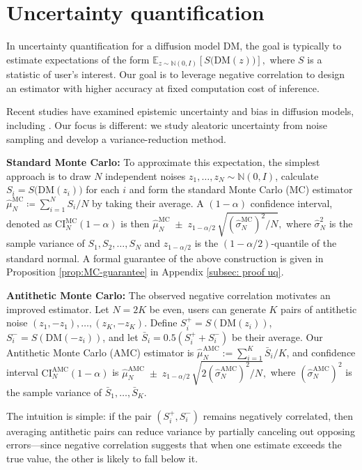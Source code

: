 \documentclass[12pt]{article}
\newcommand{\0}{\mathbf{0}}
\newcommand{\bE}{\mathbb{E}}
\newcommand{\bN}{\mathbb{N}}
\newcommand{\DM}{\text{DM}}
\newcommand{\MC}{\text{MC}}
\newcommand{\CI}{\text{CI}}
\newcommand{\AMC}{\text{AMC}}
\begin{document}
\section{Uncertainty quantification}\label{sec:uncertainty quantification}

In uncertainty quantification for a diffusion model $\DM$, the goal is typically to estimate expectations of the form
$\bE_{z \sim \bN(0,I)}\!\left[S\bigl(\DM(z)\bigr)\right],$
where $S$ is a statistic of user's interest. Our goal is to leverage negative correlation to design an estimator with higher accuracy at fixed computation cost of inference. 


 Recent studies have examined epistemic uncertainty and bias in diffusion models, including \cite{berry2024shedding, berry2025seeing}. Our focus is different: we study aleatoric uncertainty from noise sampling and develop a variance-reduction method.





\textbf{Standard Monte Carlo:}  To approximate this expectation, the simplest approach is to draw $N$ independent noises $z_1,\dots,z_N\sim\bN(0,I)$, calculate $S_i = S\bigl(\DM(z_i)\bigr)$ for each $i$ and form the standard Monte Carlo (MC) estimator $\hat\mu_N^\MC \coloneq  \sum_{i=1}^N S_i/N$ by taking their average. A $(1-\alpha)$ confidence interval, denoted as $\CI^\MC_N(1-\alpha)$ is then
$
\hat\mu_N^\MC \;\pm\; z_{1-\alpha/2}\,\sqrt{(\hat\sigma_N^\MC)^2/N},
$ where
$\hat\sigma_N^2$ is the sample variance of $S_1,S_2,\ldots, S_N$
and $z_{1-\alpha/2}$ is the $(1-\alpha/2)$-quantile of the standard normal. A formal guarantee of the above construction is given in Proposition \ref{prop:MC-guarantee} in Appendix \ref{subsec: proof uq}.


\textbf{Antithetic Monte Carlo:} The observed negative correlation motivates an improved estimator. Let $N = 2K$ be even, users can generate $K$ pairs of antithetic noise $(z_1, -z_1), \ldots, (z_K, -z_K)$. Define $S_i^+ = S(\DM(z_i))$, $S_i^- = S(\DM(-z_i))$, and let $\bar S_i = 0.5 (S_i^+ + S_i^-)$ be their average. Our Antithetic Monte Carlo (AMC) estimator is $\hat\mu_N^\AMC := \sum_{i=1}^K \bar S_i /K$, and confidence interval $\CI_N^\AMC(1-\alpha)$ is
$
\hat\mu_N^\AMC \;\pm\; z_{1-\alpha/2}\,\sqrt{2(\hat\sigma_N^\AMC)^2/N},
$
where $(\hat\sigma_N^\AMC)^2$ is the sample variance of $\bar S_1, \ldots, \bar S_{K}$. 

The intuition is simple: if the pair $(S_i^+, S_i^-)$ remains negatively correlated, then averaging antithetic pairs can reduce variance by partially canceling out opposing errors—since negative correlation suggests that when one estimate exceeds the true value, the other is likely to fall below it. 
\end{document}
